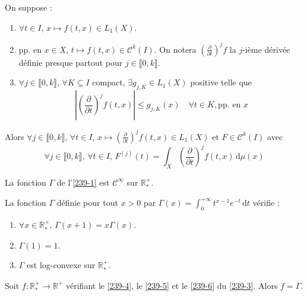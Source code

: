   \begin{theorem}
    On suppose :
    \begin{enumerate}[label={\bfseries(\roman*)}]
      \item $\forall t \in I$, $x \mapsto f(t,x) \in L_1(X)$.
      \item pp. en $x \in X$, $t \mapsto f(t,x) \in \mathcal{C}^k(I)$. On notera $\left(\frac{\partial}{\partial t}\right)^j f$ la $j$-ième dérivée définie presque partout pour $j \in \llbracket 0, k \rrbracket$.
      \item $\forall j \in \llbracket 0, k \rrbracket$, $\forall K \subseteq I$ compact, $\exists g_{j,K} \in L_1(X)$ positive telle que
      \[ \left| \left(\frac{\partial}{\partial t}\right)^j f(t,x) \right| \leq g_{j,K}(x) \quad \forall t \in K, \text{pp. en } x \]
    \end{enumerate}
    Alors $\forall j \in \llbracket 0, k \rrbracket$, $\forall t \in I$, $x \mapsto \left(\frac{\partial}{\partial t}\right)^j f(t,x) \in L_1(X)$ et $F \in \mathcal{C}^k(I)$ avec
    \[ \forall j \in \llbracket 0, k \rrbracket, \, \forall t \in I, \, F^{(j)}(t) = \int_X \left(\frac{\partial}{\partial t}\right)^j f(t, x) \, \mathrm{d}\mu(x) \]
  \end{theorem}


  \begin{example}
    La fonction $\Gamma$ de l'\cref{239-1} est $\mathcal{C}^\infty$ sur $\mathbb{R}^+_*$.
  \end{example}


  \begin{lemma}
    \label{239-3}
    La fonction $\Gamma$ définie pour tout $x > 0$ par $\Gamma(x) = \int_0^{+\infty} t^{x-1} e^{-t} \, \mathrm{d}t$ vérifie :
    \begin{enumerate}[label={\bfseries(\roman*)}]
      \item \label{239-4} $\forall x \in \mathbb{R}^+_*$, $\Gamma(x+1) = x\Gamma(x)$.
      \item \label{239-5} $\Gamma(1) = 1$.
      \item \label{239-6} $\Gamma$ est log-convexe sur $\mathbb{R}^+_*$.
    \end{enumerate}
  \end{lemma}


  \begin{theorem}
    Soit $f : \mathbb{R}^+_* \rightarrow \mathbb{R}^+$ vérifiant le \cref{239-4}, le \cref{239-5} et le \cref{239-6} du \cref{239-3}. Alors $f = \Gamma$.
  \end{theorem}

